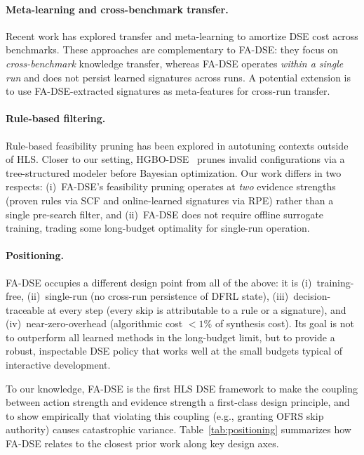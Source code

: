 \documentclass[journal]{IEEEtran}
\begin{document}
\paragraph{Meta-learning and cross-benchmark transfer.}
Recent work has explored transfer and meta-learning to amortize DSE cost across benchmarks. These approaches are complementary to FA-DSE: they focus on \emph{cross-benchmark} knowledge transfer, whereas FA-DSE operates \emph{within a single run} and does not persist learned signatures across runs. A potential extension is to use FA-DSE-extracted signatures as meta-features for cross-run transfer.

\paragraph{Rule-based filtering.}
Rule-based feasibility pruning has been explored in autotuning contexts outside of HLS. Closer to our setting, HGBO-DSE~\cite{kuang2023hgbo} prunes invalid configurations via a tree-structured modeler before Bayesian optimization. Our work differs in two respects: (i)~FA-DSE's feasibility pruning operates at \emph{two} evidence strengths (proven rules via SCF and online-learned signatures via RPE) rather than a single pre-search filter, and (ii)~FA-DSE does not require offline surrogate training, trading some long-budget optimality for single-run operation.

\paragraph{Positioning.}
FA-DSE occupies a different design point from all of the above: it is (i)~training-free, (ii)~single-run (no cross-run persistence of DFRL state), (iii)~decision-traceable at every step (every skip is attributable to a rule or a signature), and (iv)~near-zero-overhead (algorithmic cost $<1\%$ of synthesis cost). Its goal is not to outperform all learned methods in the long-budget limit, but to provide a robust, inspectable DSE policy that works well at the small budgets typical of interactive development.

To our knowledge, FA-DSE is the first HLS DSE framework to make the coupling between action strength and evidence strength a first-class design principle, and to show empirically that violating this coupling (e.g., granting OFRS skip authority) causes catastrophic variance. Table~\ref{tab:positioning} summarizes how FA-DSE relates to the closest prior work along key design axes.
\end{document}
